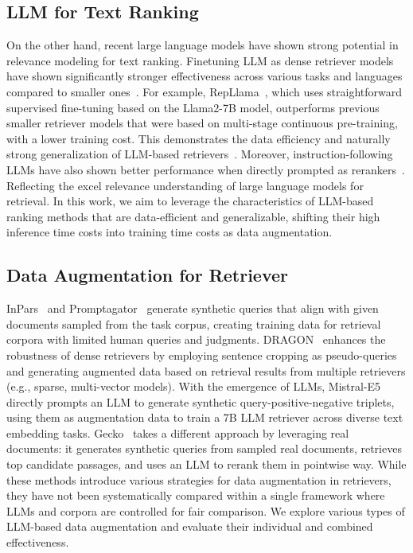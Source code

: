 \subsection{LLM for Text Ranking}
On the other hand, recent large language models have shown strong potential in relevance modeling for text ranking.
Finetuning LLM as dense retriever models have shown significantly stronger effectiveness across various tasks and languages compared to smaller ones~\citep{wang-etal-2024-improving-text, muennighoff2024generative, springer2024repetition, li2024making}.
For example, RepLlama~\citep{ma2024repllama}, which uses straightforward supervised fine-tuning based on the Llama2-7B model, outperforms previous smaller retriever models that were based on multi-stage continuous pre-training, with a lower training cost.
This demonstrates the data efficiency and naturally strong generalization of LLM-based retrievers~\citep{luo-etal-2024-large}.
Moreover, instruction-following LLMs have also shown better performance when directly prompted as rerankers~\citep{ma2023zeroshot, sun-etal-2023-chatgpt}.
Reflecting the excel relevance understanding of large language models for retrieval.
In this work, we aim to leverage the characteristics of LLM-based ranking methods that are data-efficient and generalizable, shifting their high inference time costs into training time costs as data augmentation.


\subsection{Data Augmentation for Retriever}
InPars~\citep{bonifacio2022inpars} and Promptagator~\citep{promptagator} generate synthetic queries that align with given documents sampled from the task corpus, creating training data for retrieval corpora with limited human queries and judgments.
DRAGON~\citep{lin-etal-2023-train} enhances the robustness of dense retrievers by employing sentence cropping as pseudo-queries and generating augmented data based on retrieval results from multiple retrievers (e.g., sparse, multi-vector models).
With the emergence of LLMs, Mistral-E5~\citep{wang-etal-2024-improving-text} directly prompts an LLM to generate synthetic query-positive-negative triplets, using them as augmentation data to train a 7B LLM retriever across diverse text embedding tasks.
Gecko~\citep{lee2024gecko} takes a different approach by leveraging real documents: it generates synthetic queries from sampled real documents, retrieves top candidate passages, and uses an LLM to rerank them in pointwise way.
While these methods introduce various strategies for data augmentation in retrievers, they have not been systematically compared within a single framework where LLMs and corpora are controlled for fair comparison.
We explore various types of LLM-based data augmentation and evaluate their individual and combined effectiveness.

